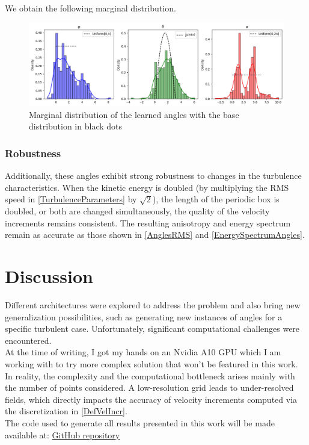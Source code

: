 \documentclass[a4paper,12pt]{article}
\theoremstyle{definition}
\begin{document}
We obtain the following marginal distribution.
\begin{figure}[H]
    \centering 
    \includegraphics[width=1.0\linewidth]{illustrations/AnglesDistributionLearned.png}
    \caption{Marginal distribution of the learned angles with the base distribution in black dots}
\end{figure}

\subsubsection{Robustness}
Additionally, these angles exhibit strong robustness to changes in the turbulence characteristics. When the kinetic energy is doubled (by multiplying the RMS speed in \ref{TurbulenceParameters} by $\sqrt{2}$), the length of the periodic box is doubled, or both are changed simultaneously, the quality of the velocity increments remains consistent. The resulting anisotropy and energy spectrum remain as accurate as those shown in \ref{AnglesRMS} and \ref{EnergySpectrumAngles}.

\section{Discussion} \label{Discussion}

Different architectures were explored to address the problem and also bring new generalization possibilities, such as generating new instances of angles for a specific turbulent case. Unfortunately, significant computational challenges were encountered. \\
At the time of writing, I got my hands on an Nvidia A10 GPU which I am working with to try more complex solution that won't be featured in this work. \\
In reality, the complexity and the computational bottleneck arises mainly with the number of points considered. A low-resolution grid leads to under-resolved fields, which directly impacts the accuracy of velocity increments computed via the discretization in \ref{DefVelIncr}. \\
The code used to generate all results presented in this work will be made available at: \href{https://github.com/SamyBraik/InternshipCode}{GitHub repository}
\newpage
\end{document}
